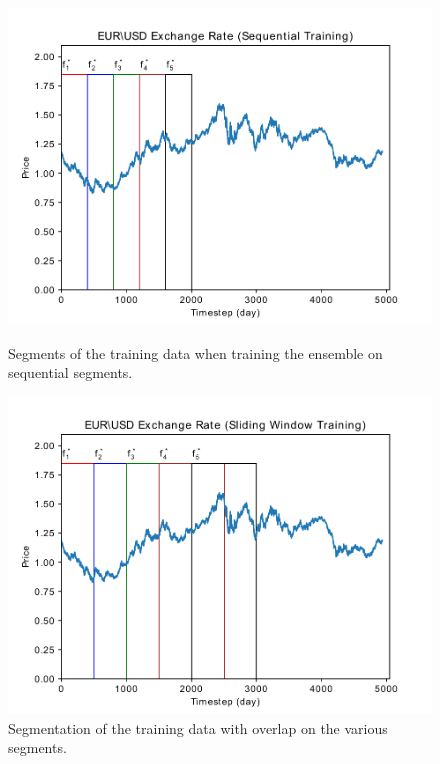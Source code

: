 \documentclass{article}
\begin{document}
\begin{figure}
\centering
{}
	\centering
  \includegraphics[scale=0.31]{imgs/sequential_forex.pdf}
  \caption{Segments of the training data when training the ensemble on sequential segments.}\label{fig:sequential}
\endminipage\hfill
{}
	\centering
  \includegraphics[scale=0.31]{imgs/overlap_forex.pdf}
  \caption{Segmentation of the training data with overlap on the various segments.}\label{fig:overlap}
\endminipage\hfill
\end{figure}
\end{document}
